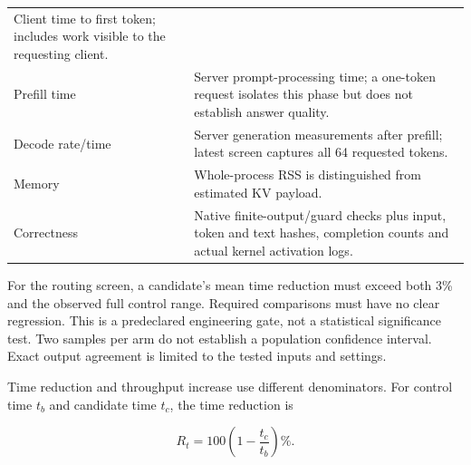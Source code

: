 \documentclass[10pt,a4paper]{article}
\begin{document}
\begin{longtable}[]{@{}ll@{}}
\begin{minipage}[t]{0.47\columnwidth}
Client time to first token; includes work visible to the requesting
client.\strut
\end{minipage}\tabularnewline
\begin{minipage}[t]{0.47\columnwidth}\raggedright
Prefill time\strut
\end{minipage} & \begin{minipage}[t]{0.47\columnwidth}\raggedright
Server prompt-processing time; a one-token request isolates this phase
but does not establish answer quality.\strut
\end{minipage}\tabularnewline
\begin{minipage}[t]{0.47\columnwidth}\raggedright
Decode rate/time\strut
\end{minipage} & \begin{minipage}[t]{0.47\columnwidth}\raggedright
Server generation measurements after prefill; latest screen captures all
64 requested tokens.\strut
\end{minipage}\tabularnewline
\begin{minipage}[t]{0.47\columnwidth}\raggedright
Memory\strut
\end{minipage} & \begin{minipage}[t]{0.47\columnwidth}\raggedright
Whole-process RSS is distinguished from estimated KV payload.\strut
\end{minipage}\tabularnewline
\begin{minipage}[t]{0.47\columnwidth}\raggedright
Correctness\strut
\end{minipage} & \begin{minipage}[t]{0.47\columnwidth}\raggedright
Native finite-output/guard checks plus input, token and text hashes,
completion counts and actual kernel activation logs.\strut
\end{minipage}\tabularnewline
\bottomrule
\end{longtable}

For the routing screen, a candidate's mean time reduction must exceed
both 3\% and the observed full control range. Required comparisons must
have no clear regression. This is a predeclared engineering gate, not a
statistical significance test. Two samples per arm do not establish a
population confidence interval. Exact output agreement is limited to the
tested inputs and settings.

Time reduction and throughput increase use different denominators. For
control time \(t_b\) and candidate time \(t_c\), the time reduction is

\[R_t = 100\left(1-\frac{t_c}{t_b}\right)\%. \]
\end{document}
